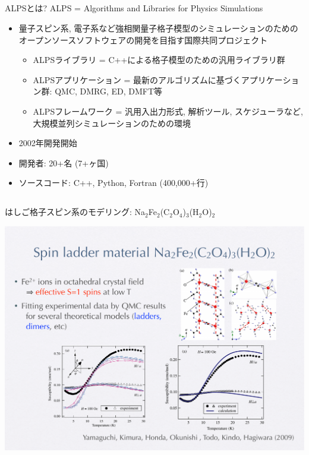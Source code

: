 \subsection*{\redb\whiteb\greenb}
\begin{frame}[t,fragile]{ALPSとは?}
  ALPS = \alert{A}lgorithms and \alert{L}ibraries for \alert{P}hysics \alert{S}imulations
  \begin{itemize}
  \item 量子スピン系, 電子系など強相関量子格子模型のシミュレーションのためのオープンソースソフトウェアの開発を目指す国際共同プロジェクト
    \begin{itemize}
    \item ALPSライブラリ = C++による格子模型のための汎用ライブラリ群
    \item ALPSアプリケーション = 最新のアルゴリズムに基づくアプリケーション群: QMC, DMRG, ED, DMFT等
    \item ALPSフレームワーク = 汎用入出力形式, 解析ツール, スケジューラなど, 大規模並列シミュレーションのための環境
    \end{itemize}
  \item 2002年開発開始
  \item 開発者: 20+名 (7+ヶ国)
  \item ソースコード: C++, Python, Fortran (400,000+行)
  \end{itemize}
\end{frame}

\subsection*{\redb\whiteb\greenb}
\begin{frame}[fragile]{はしご格子スピン系のモデリング: Na$_2$Fe$_2$(C$_2$O$_4$)$_3$(H$_2$O)$_2$}
  \begin{center}
    \includegraphics[height=.8\textheight]{ladder.pdf}
  \end{center}
\end{frame}

